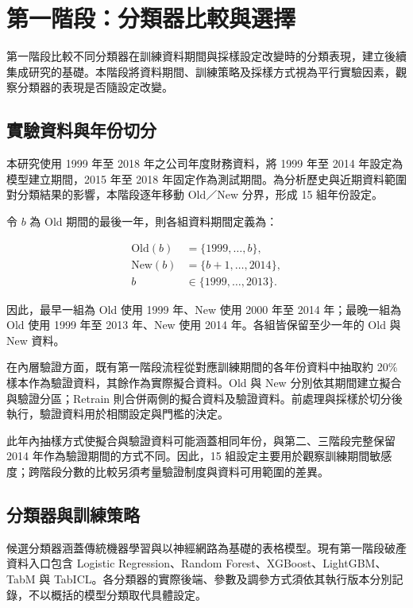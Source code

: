 \section{第一階段：分類器比較與選擇}\label{sec:method-phase1}

第一階段比較不同分類器在訓練資料期間與採樣設定改變時的分類表現，建立後續集成研究的基礎。本階段將資料期間、訓練策略及採樣方式視為平行實驗因素，觀察分類器的表現是否隨設定改變。

\subsection{實驗資料與年份切分}

本研究使用 1999 年至 2018 年之公司年度財務資料，將 1999 年至 2014 年設定為模型建立期間，2015 年至 2018 年固定作為測試期間。為分析歷史與近期資料範圍對分類結果的影響，本階段逐年移動 Old／New 分界，形成 15 組年份設定。

令 \(b\) 為 Old 期間的最後一年，則各組資料期間定義為：

\begin{equation}\label{eq:method-years}
\begin{aligned}
\mathrm{Old}(b)&=\{1999,\ldots,b\},\\
\mathrm{New}(b)&=\{b+1,\ldots,2014\},\\
b&\in\{1999,\ldots,2013\}.
\end{aligned}
\end{equation}

因此，最早一組為 Old 使用 1999 年、New 使用 2000 年至 2014 年；最晚一組為 Old 使用 1999 年至 2013 年、New 使用 2014 年。各組皆保留至少一年的 Old 與 New 資料。

在內層驗證方面，既有第一階段流程從對應訓練期間的各年份資料中抽取約 20\% 樣本作為驗證資料，其餘作為實際擬合資料。Old 與 New 分別依其期間建立擬合與驗證分區；Retrain 則合併兩側的擬合資料及驗證資料。前處理與採樣於切分後執行，驗證資料用於相關設定與門檻的決定。

此年內抽樣方式使擬合與驗證資料可能涵蓋相同年份，與第二、三階段完整保留 2014 年作為驗證期間的方式不同。因此，15 組設定主要用於觀察訓練期間敏感度；跨階段分數的比較另須考量驗證制度與資料可用範圍的差異。

\subsection{分類器與訓練策略}

候選分類器涵蓋傳統機器學習與以神經網路為基礎的表格模型。現有第一階段破產資料入口包含 Logistic Regression、Random Forest、XGBoost、LightGBM、TabM 與 TabICL。各分類器的實際後端、參數及調參方式須依其執行版本分別記錄，不以概括的模型分類取代具體設定。


